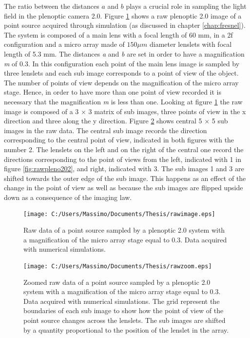 The ratio between the distances $a$ and $b$ plays a crucial role in sampling the light field in the plenoptic camera 2.0. Figure \ref{fig:rawpleno20} shows a raw plenoptic 2.0 image of a point source acquired through simulation (as discussed in chapter \ref{chap:fresnel}). The system is composed of a main lens with a focal length of 60 mm, in a 2f configuration and a micro array made of $150 \mu m$ diameter lenslets with focal length of 5.3 mm. The distances \textit{a} and \textit{b} are set in order to have a magnification \textit{m} of 0.3. In this configuration each point of the main lens image is sampled by three lenslets and each sub image corresponds to a point of view of the object. The number of points of view depends on the magnification of the micro array stage. Hence, in order to have more than one point of view recorded it is necessary that the magnification \textit{m} is less than one. Looking at figure \ref{fig:rawpleno20} the raw image is composed of a 3 $\times$ 3 matrix of sub images, three points of view in the x direction and three along the y direction. Figure \ref{fig:rawpleno203} shows central 5 $\times$ 5 sub images in the raw data. The central sub image records the direction corresponding to the central point of view, indicated in both figures with the number 2. The lenslets on the left and on the right of the central one record the directions corresponding to the point of views from the left, indicated with 1 in figure \ref{fig:rawpleno202}, and right, indicated with 3. The sub images 1 and 3 are shifted towards the outer edge of the sub image. This happens as an effect of the change in the point of view as well as because the sub images are flipped upside down as a consequence of the imaging law.
  \begin{figure}[H]
 	\centering
 	\texttt{[image: C:/Users/Massimo/Documents/Thesis/rawimage.eps]}
 	\caption{\label{fig:rawpleno20} Raw data of a point source sampled by a plenoptic 2.0 system with a magnification of the micro array stage equal to 0.3. Data acquired with numerical simulations. }
 \end{figure}
 \begin{figure}[H]
 	\centering
 	\texttt{[image: C:/Users/Massimo/Documents/Thesis/rawzoom.eps]}
 	\caption{\label{fig:rawpleno203} Zoomed raw data of a point source sampled by a plenoptic 2.0 system with a magnification of the micro array stage equal to 0.3. Data acquired with numerical simulations. The grid represent the boundaries of each sub image to show how the point of view of the point source changes across the lenslets. The sub images are shifted by a quantity proportional to the position of the lenslet in the array.  }
 \end{figure}
